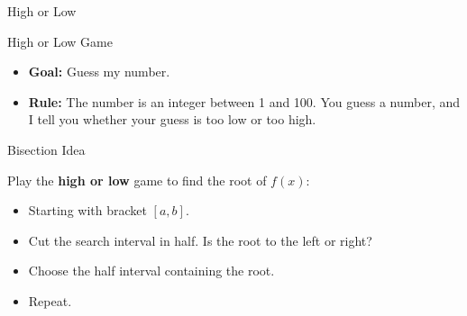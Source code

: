 \documentclass[10pt]{beamer}
\begin{document}

\begin{frame}{High or Low}
\begin{block}{High or Low Game}
\begin{itemize}
    \item \textbf{Goal:} Guess my number.
    \item \textbf{Rule:} The number is an integer between 1 and 100. You guess a number, and I tell you whether your guess is too low or too high.
\end{itemize}
\end{block}
\vspace{3mm}
\end{frame}

\begin{frame}{Bisection Idea}
\begin{center}
\end{center}

Play the \textbf{high or low} game to find the root of $f(x)$:
\begin{itemize}
    \item Starting with bracket \([a,b]\).
    \item Cut the search interval in half. Is the root to the left or right?
    \item Choose the half interval containing the root. 
    \item Repeat.
\end{itemize}
\end{frame}
\end{document}
